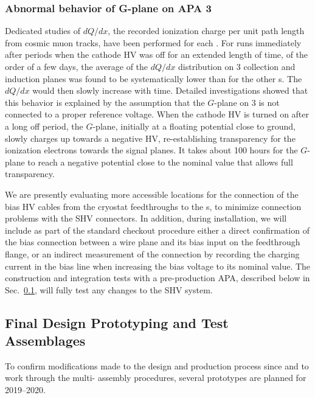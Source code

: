 \subsubsection{Abnormal behavior of G-plane on APA 3}
\label{sec:fdsp-apa-qa-g-plane}

Dedicated studies of $dQ/dx$, the recorded ionization charge per unit path length from cosmic muon tracks, have been performed for each . For runs immediately after periods when the cathode HV was off for an extended length of time, of the order of a few days, the average of the $dQ/dx$ distribution on  3 collection and induction planes was found to be systematically lower than for the other s.  The $dQ/dx$ would then slowly increase with time.  Detailed investigations showed that this behavior is explained by the assumption that the $G$-plane on  3 is not connected to a proper reference voltage. When the cathode HV is turned on after a long off period, the $G$-plane, initially at a floating potential close to ground, slowly charges up towards a negative HV,  re-establishing transparency for the ionization electrons towards the signal planes. It takes about 100 hours for the $G$-plane to reach a negative potential close to the nominal value that allows full transparency.

We are presently evaluating more accessible locations for the connection of the bias HV cables from the cryostat feedthroughs to the s, to minimize connection problems with the SHV connectors. In addition, during installation, we will include as part of the standard checkout procedure either a direct confirmation of the bias connection between a wire plane and its bias input on the feedthrough flange, or an indirect measurement of the connection by recording the charging current in the bias line when increasing the bias voltage to its nominal value.  The construction and integration tests with a pre-production APA, described below in Sec.~\ref{sec:fdsp-apa-qa-prototyping}, will fully test any changes to the SHV system. 


\subsection{Final Design Prototyping and Test Assemblages}
\label{sec:fdsp-apa-qa-prototyping}


To confirm modifications made to the  design and production process since  and to work through the multi- assembly procedures, several prototypes are planned for 2019--2020.

